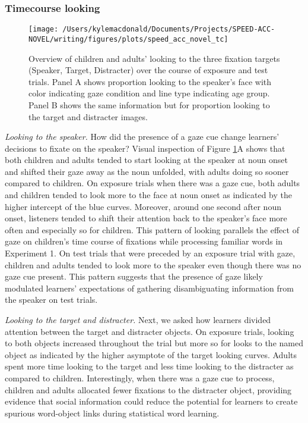 \documentclass[oneside]{report}
\begin{document}
\subsubsection{Timecourse looking}\label{timecourse-looking}
\begin{figure}[!t]

{\centering \texttt{[image: /Users/kylemacdonald/Documents/Projects/SPEED-ACC-NOVEL/writing/figures/plots/speed\_acc\_novel\_tc]} 

}

\caption[Overview of looking behvavior in Experiment 5.3.]{Overview of children and adults' looking to the three fixation targets (Speaker, Target, Distracter) over the course of exposure and test trials. Panel A shows proportion looking to the speaker's face with color indicating gaze condition and line type indicating age group. Panel B shows the same information but for proportion looking to the target and distracter images.}\label{fig:san-tc-plot}
\end{figure}
\emph{Looking to the speaker.} How did the presence of a gaze cue change
learners' decisions to fixate on the speaker? Visual inspection of
Figure \ref{fig:san-tc-plot}A shows that both children and adults tended
to start looking at the speaker at noun onset and shifted their gaze
away as the noun unfolded, with adults doing so sooner compared to
children. On exposure trials when there was a gaze cue, both adults and
children tended to look more to the face at noun onset as indicated by
the higher intercept of the blue curves. Moreover, around one second
after noun onset, listeners tended to shift their attention back to the
speaker's face more often and especially so for children. This pattern
of looking parallels the effect of gaze on children's time course of
fixations while processing familiar words in Experiment 1. On test
trials that were preceded by an exposure trial with gaze, children and
adults tended to look more to the speaker even though there was no gaze
cue present. This pattern suggests that the presence of gaze likely
modulated learners' expectations of gathering disambiguating information
from the speaker on test trials.

\emph{Looking to the target and distracter.} Next, we asked how learners
divided attention between the target and distracter objects. On exposure
trials, looking to both objects increased throughout the trial but more
so for looks to the named object as indicated by the higher asymptote of
the target looking curves. Adults spent more time looking to the target
and less time looking to the distracter as compared to children.
Interestingly, when there was a gaze cue to process, children and adults
allocated fewer fixations to the distracter object, providing evidence
that social information could reduce the potential for learners to
create spurious word-object links during statistical word learning.
\end{document}
